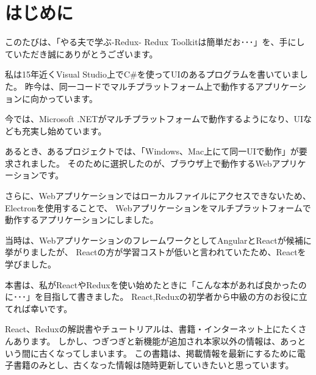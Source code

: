 \chapter{はじめに}
\label{chap:00-preface}

このたびは、「やる夫で学ぶ{-}Redux{-} Redux Toolkitは簡単だお･･･」を、手にしていただき誠にありがとうございます。

\vspace*{\baselineskip}
\vspace*{\baselineskip}

私は15年近くVisual Studio上でC\#を使ってUIのあるプログラムを書いていました。
昨今は、同一コードでマルチプラットフォーム上で動作するアプリケーションに向かっています。

\vspace*{\baselineskip}

今では、Microsoft .NETがマルチプラットフォームで動作するようになり、UIなども充実し始めています。

\vspace*{\baselineskip}

あるとき、あるプロジェクトでは、「Windows、Mac上にて同一UIで動作」が要求されました。
そのために選択したのが、ブラウザ上で動作するWebアプリケーションです。

\vspace*{\baselineskip}

さらに、Webアプリケーションではローカルファイルにアクセスできないため、Electronを使用することで、
Webアプリケーションをマルチプラットフォームで動作するアプリケーションにしました。

\vspace*{\baselineskip}

当時は、WebアプリケーションのフレームワークとしてAngularとReactが候補に挙がりましたが、
Reactの方が学習コストが低いと言われていたため、Reactを学びました。

\vspace*{\baselineskip}

本書は、私がReactやReduxを使い始めたときに「こんな本があれば良かったのに･･･」を目指して書きました。
React,Reduxの初学者から中級の方のお役に立てれば幸いです。

\vspace*{\baselineskip}

React、Reduxの解説書やチュートリアルは、書籍・インターネット上にたくさんあります。
しかし、つぎつぎと新機能が追加され本家以外の情報は、あっという間に古くなってしまいます。
この書籍は、掲載情報を最新にするために電子書籍のみとし、古くなった情報は随時更新していきたいと思っています。


